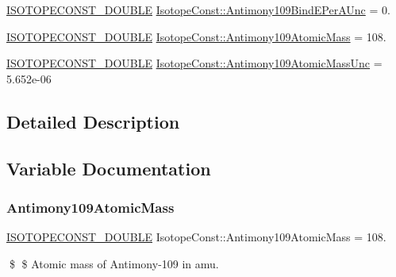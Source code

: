 \begin{DoxyCompactItemize}
\mbox{\hyperlink{group___isotope_const-_macros_ga8f45a7272ce02c0b4c65c44636ed719a}{I\+S\+O\+T\+O\+P\+E\+C\+O\+N\+S\+T\+\_\+\+D\+O\+U\+B\+LE}} \mbox{\hyperlink{group___isotope_const-_antimony-_sb109_ga0364c5790ef443e9354c249fc36ff3f9}{Isotope\+Const\+::\+Antimony109\+Bind\+E\+Per\+A\+Unc}} = 0.
\item 
\mbox{\hyperlink{group___isotope_const-_macros_ga8f45a7272ce02c0b4c65c44636ed719a}{I\+S\+O\+T\+O\+P\+E\+C\+O\+N\+S\+T\+\_\+\+D\+O\+U\+B\+LE}} \mbox{\hyperlink{group___isotope_const-_antimony-_sb109_gad27310a666da4cae178d2648911031e3}{Isotope\+Const\+::\+Antimony109\+Atomic\+Mass}} = 108.
\item 
\mbox{\hyperlink{group___isotope_const-_macros_ga8f45a7272ce02c0b4c65c44636ed719a}{I\+S\+O\+T\+O\+P\+E\+C\+O\+N\+S\+T\+\_\+\+D\+O\+U\+B\+LE}} \mbox{\hyperlink{group___isotope_const-_antimony-_sb109_gad86a5f965facfc3bb91c0bfaeab52844}{Isotope\+Const\+::\+Antimony109\+Atomic\+Mass\+Unc}} = 5.\+652e-\/06
\end{DoxyCompactItemize}


\subsection{Detailed Description}


\subsection{Variable Documentation}
\mbox{\label{group___isotope_const-_antimony-_sb109_gad27310a666da4cae178d2648911031e3}} 
\subsubsection{\texorpdfstring{Antimony109\+Atomic\+Mass}{Antimony109AtomicMass}}
{\footnotesize\ttfamily \mbox{\hyperlink{group___isotope_const-_macros_ga8f45a7272ce02c0b4c65c44636ed719a}{I\+S\+O\+T\+O\+P\+E\+C\+O\+N\+S\+T\+\_\+\+D\+O\+U\+B\+LE}} Isotope\+Const\+::\+Antimony109\+Atomic\+Mass = 108.}

\$ \$ Atomic mass of Antimony-\/109 in amu. \mbox{\label{group___isotope_const-_antimony-_sb109_gad86a5f965facfc3bb91c0bfaeab52844}} 

